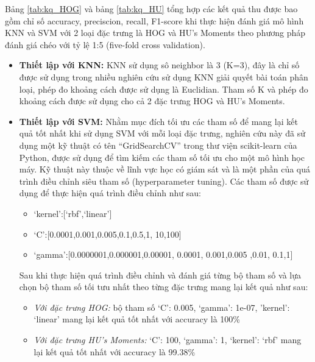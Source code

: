\documentclass[a4paper]{article}
\begin{document}
Bảng \ref{tab:kq_HOG} và bảng \ref{tab:kq_HU} tổng hợp các kết quả thu được bao gồm chỉ số accuracy, preciscion, recall, F1-score khi thực hiện đánh giá mô hình KNN và SVM với 2 loại đặc trưng là HOG và HU's Moments theo phương pháp đánh giá chéo với tỷ lệ 1:5 (five-fold cross validation). 
\begin{itemize}[label={}]
    \item \textbf{Thiết lập với KNN: }KNN sử dụng sô neighbor là 3 (K=3), đây là chỉ số được sử dụng trong nhiều nghiên cứu sử dụng KNN giải quyết bài toán phân loại, phép đo khoảng cách được sử dụng là Euclidian. Tham số K và phép đo khoảng cách được sử dụng cho cả 2 đặc trưng HOG và HU's Moments.
    \item \textbf{Thiết lập với SVM: }Nhằm mục đích tối ưu các tham số để mang lại kết quả tốt nhất khi sử dụng SVM với mỗi loại đặc trưng, nghiên cứu này đã sử dụng một kỹ thuật có tên ``GridSearchCV'' trong thư viện scikit-learn của Python, được sử dụng để tìm kiếm các tham số tối ưu cho một mô hình học máy. Kỹ thuật này thuộc về lĩnh vực học có giám sát và là một phần của quá trình điều chỉnh siêu tham số (hyperparameter tuning). Các tham số được sử dụng để thực hiện quá trình điều chỉnh như sau:
    \begin{itemize}[label={}]
        \item `kernel':[`rbf',`linear']
        \item `C':[0.0001,0.001,0.005,0.1,0.5,1, 10,100]
        \item `gamma':[0.0000001,0.000001,0.00001, 0.0001, 0.001,0.005 ,0.01, 0.1,1] 
    \end{itemize}
    Sau khi thực hiện quá trình điều chỉnh và đánh giá từng bộ tham số và lựa chọn bộ tham số tối tưu nhất theo từng đặc trưng mang lại kết quả như sau:
    \begin{itemize}[label={}]
        \item \textit{Với đặc trưng HOG:} bộ tham số {`C': 0.005, `gamma': 1e-07, 'kernel': `linear'} mang lại kết quả tốt nhất với accuracy là 100\% 
        \item \textit{Với đặc trưng HU's Moments:} {`C': 100, `gamma': 1, `kernel': `rbf'} mang lại kết quả tốt nhất với accuracy là 99.38\%
    \end{itemize}
\end{itemize}
\end{document}
